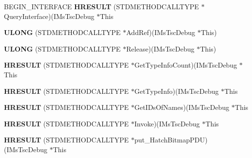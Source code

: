 \begin{DoxyCompactItemize}
\mbox{\label{struct_i_ms_tsc_debug_vtbl_acfcb005e3d8e0d725c5974a1e80eece0}} 
B\+E\+G\+I\+N\+\_\+\+I\+N\+T\+E\+R\+F\+A\+CE {\bfseries H\+R\+E\+S\+U\+LT} (S\+T\+D\+M\+E\+T\+H\+O\+D\+C\+A\+L\+L\+T\+Y\+PE $\ast$Query\+Interface)(I\+Ms\+Tsc\+Debug $\ast$This
\item 
\mbox{\label{struct_i_ms_tsc_debug_vtbl_a7821cbe3980423dac9b8ec765b2912a1}} 
{\bfseries U\+L\+O\+NG} (S\+T\+D\+M\+E\+T\+H\+O\+D\+C\+A\+L\+L\+T\+Y\+PE $\ast$Add\+Ref)(I\+Ms\+Tsc\+Debug $\ast$This)
\item 
\mbox{\label{struct_i_ms_tsc_debug_vtbl_a9958164709c55f8a14102045900ebb2c}} 
{\bfseries U\+L\+O\+NG} (S\+T\+D\+M\+E\+T\+H\+O\+D\+C\+A\+L\+L\+T\+Y\+PE $\ast$Release)(I\+Ms\+Tsc\+Debug $\ast$This)
\item 
\mbox{\label{struct_i_ms_tsc_debug_vtbl_ac89162ce89be6d430ade901fcd3ed2ee}} 
{\bfseries H\+R\+E\+S\+U\+LT} (S\+T\+D\+M\+E\+T\+H\+O\+D\+C\+A\+L\+L\+T\+Y\+PE $\ast$Get\+Type\+Info\+Count)(I\+Ms\+Tsc\+Debug $\ast$This
\item 
\mbox{\label{struct_i_ms_tsc_debug_vtbl_a41da77f6703171b0aefcc66054fc02c4}} 
{\bfseries H\+R\+E\+S\+U\+LT} (S\+T\+D\+M\+E\+T\+H\+O\+D\+C\+A\+L\+L\+T\+Y\+PE $\ast$Get\+Type\+Info)(I\+Ms\+Tsc\+Debug $\ast$This
\item 
\mbox{\label{struct_i_ms_tsc_debug_vtbl_ad1970e067f853908ec6d4ba9f6808808}} 
{\bfseries H\+R\+E\+S\+U\+LT} (S\+T\+D\+M\+E\+T\+H\+O\+D\+C\+A\+L\+L\+T\+Y\+PE $\ast$Get\+I\+Ds\+Of\+Names)(I\+Ms\+Tsc\+Debug $\ast$This
\item 
\mbox{\label{struct_i_ms_tsc_debug_vtbl_ac55a3f55d6d7498ef1f008811dd06a3a}} 
{\bfseries H\+R\+E\+S\+U\+LT} (S\+T\+D\+M\+E\+T\+H\+O\+D\+C\+A\+L\+L\+T\+Y\+PE $\ast$Invoke)(I\+Ms\+Tsc\+Debug $\ast$This
\item 
\mbox{\label{struct_i_ms_tsc_debug_vtbl_af67f6be08afa5a0e6755faaef5e574e6}} 
{\bfseries H\+R\+E\+S\+U\+LT} (S\+T\+D\+M\+E\+T\+H\+O\+D\+C\+A\+L\+L\+T\+Y\+PE $\ast$put\+\_\+\+Hatch\+Bitmap\+P\+DU)(I\+Ms\+Tsc\+Debug $\ast$This

\end{DoxyCompactItemize}
